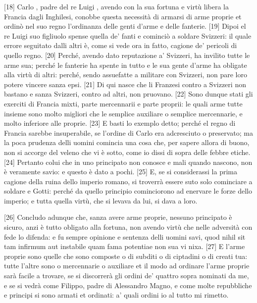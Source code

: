{[}18{]} Carlo , padre del re Luigi , avendo con la sua fortuna e
virtù libera la Francia dagli Inghilesi, conobbe questa necessità di
armarsi di arme proprie et ordinò nel suo regno l'ordinanza delle genti
d'arme e delle fanterie. {[}19{]} Dipoi el re Luigi suo figliuolo spense
quella de' fanti e cominciò a soldare Svizzeri: il quale errore
seguitato dalli altri è, come si vede ora in fatto, cagione de' pericoli
di quello regno. {[}20{]} Perché, avendo dato reputazione a' Svizzeri,
ha invilito tutte le arme sua; perché le fanterie ha spente in tutto e
le sua gente d'arme ha obligate alla virtù di altri: perché, sendo
assuefatte a militare con Svizzeri, non pare loro potere vincere sanza
epsi. {[}21{]} Di qui nasce che li Franzesi contro a Svizzeri non
bastano e sanza Svizzeri, contro ad altri, non pruovano. {[}22{]} Sono
dunque stati gli exerciti di Francia mixti, parte mercennarii e parte
proprii: le quali arme tutte insieme sono molto migliori che le semplice
auxiliare o semplice mercennarie, e molto inferiore alle proprie.
{[}23{]} E basti lo exemplo detto; perché el regno di Francia sarebbe
insuperabile, se l'ordine di Carlo era adcresciuto o preservato; ma la
poca prudenza delli uomini comincia una cosa che, per sapere allora di
buono, non si accorge del veleno che vi è sotto, come io dissi di sopra
delle febbre etiche. {[}24{]} Pertanto colui che in uno principato non
conosce e mali quando nascono, non è veramente savio: e questo è dato a
pochi. {[}25{]} E, se si considerassi la prima cagione della ruina dello
imperio romano, si troverrà essere suto solo cominciare a soldare e
Gotti: perché da quello principio cominciorono ad enervare le forze
dello imperio; e tutta quella virtù, che si levava da lui, si dava a
loro.

\quebra

{[}26{]} Concludo adunque che, sanza avere arme proprie, nessuno
principato è sicuro, anzi è tutto obligato alla fortuna, non avendo
virtù che nelle adversità con fede lo difenda: e fu sempre opinione e
sentenza delli uomini savi, quod nihil sit tam infirmum aut instabile
quam fama potentiae non sua vi nixa. {[}27{]} E l'arme proprie sono
quelle che sono composte o di subditi o di ciptadini o di creati tua:
tutte l'altre sono o mercennarie o auxiliare et il modo ad ordinare
l'arme proprie sarà facile a trovare, se si discorrerà gli ordini de'
quattro sopra nominati da me, e se si vedrà come Filippo, padre di
Alessandro Magno, e come molte repubbliche e principi si sono armati et
ordinati: a' quali ordini io al tutto mi rimetto.

